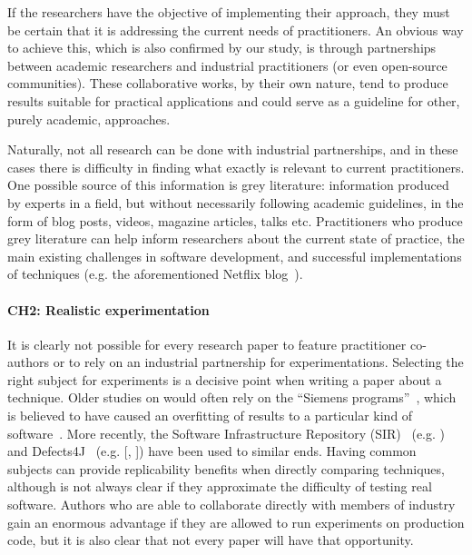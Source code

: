 If the researchers have the objective of implementing their approach, they must be certain that it is addressing the current needs of practitioners.
An obvious way to achieve this, which is also confirmed by our study, is through partnerships between academic researchers and industrial practitioners (or even open-source communities).
These collaborative works, by their own nature, tend to produce results suitable for practical applications and could serve as a guideline for other, purely academic, approaches.

Naturally, not all research can be done with industrial partnerships, and in these cases there is difficulty in finding what exactly is relevant to current practitioners.
One possible source of this information is grey literature: information produced by experts in a field, but without necessarily following academic guidelines, in the form of blog posts, videos, magazine articles, talks etc.
Practitioners who produce grey literature can help inform researchers about the current state of practice, the main existing challenges in software development, and successful implementations of techniques (e.g. the aforementioned Netflix blog~\cite{netflixlerner}).


\paragraph{CH2: Realistic experimentation}
It is clearly not possible for every research paper to feature practitioner co-authors or to rely on an industrial partnership for experimentations.
Selecting the right subject for experiments is a decisive point when writing a paper about a technique.
Older studies on \rt would often rely on the ``Siemens programs''~\cite{hutchins1994experiments}, which is believed to have caused an overfitting of results to a particular kind of software~\cite{do_recent_2016}.
More recently, the Software Infrastructure Repository (SIR)~\cite{do2005supporting} (e.g. ) and Defects4J~\cite{just2014defects4j} (e.g. [, ]) have been used to similar ends.
Having common subjects can provide replicability benefits when directly comparing techniques, although is not always clear if they approximate the difficulty of testing real software.
Authors who are able to collaborate directly with members of industry gain an enormous advantage if they are allowed to run experiments on production code, but it is also clear that not every paper will have that opportunity.

